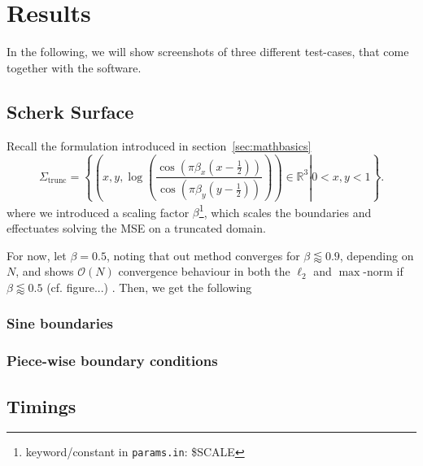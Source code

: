 \documentclass[11pt]{scrartcl}
\begin{document}
\section{Results}
In the following, we will show screenshots of three different test-cases, that come together with the software.


\subsection{Scherk Surface}
Recall the formulation introduced in section~\ref{sec:mathbasics}
\begin{equation}
\Sigma_{\text{trunc}} = \left\{ \left. \left(x, y, \log \left( \frac{\cos (\pi\beta_x(x-\frac{1}{2}))}{\cos (\pi\beta_y(y-\frac{1}{2}))} \right) \right) \in \mathbb{R}^{3} \right  | 0 < x, y < 1 \right\}.
\end{equation} 
where we introduced a scaling factor $\beta$\footnote{keyword/constant in \texttt{params.in}: \$SCALE}, which scales the boundaries and effectuates solving the MSE on a truncated domain. 

For now, let $\beta=0.5$, noting that out method converges for $\beta \lessapprox 0.9$, depending on $N$, and shows $\mathcal{O}(N)$ convergence behaviour in both the $\ell_2$ and $\max$-norm if $\beta \lessapprox 0.5$ (cf. figure...) .
Then, we get the following   

\subsubsection{Sine boundaries}

\subsubsection{Piece-wise boundary conditions}







\subsection{Timings}
\end{document}

